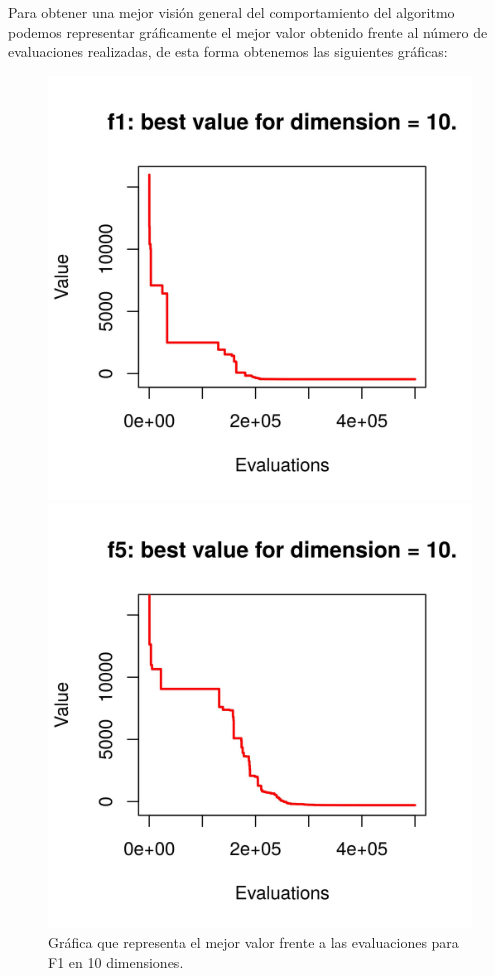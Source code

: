 \documentclass[11pt,a4paper]{article}
\begin{document}
	\clearpage
	
	\noindent Para obtener una mejor visión general del comportamiento del algoritmo podemos representar gráficamente el mejor valor obtenido frente al número de evaluaciones realizadas, de esta forma obtenemos las siguientes gráficas:
	
	\begin{figure}[!h]
		\centering
		\begin{minipage}[b]{0.4\textwidth}
			\includegraphics[width=\textwidth]{Imagenes/VS_f1_d10.jpg}
			\caption{Gráfica que representa el mejor valor frente a las evaluaciones para F1 en 10 dimensiones.}
		\end{minipage}
		\hfill
		\begin{minipage}[b]{0.4\textwidth}
			\includegraphics[width=\textwidth]{Imagenes/VS_f5_d10.jpg}

\end{minipage}
\end{figure}
\end{document}
